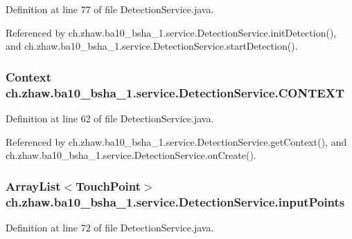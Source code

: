 Definition at line 77 of file DetectionService.java.

Referenced by ch.zhaw.ba10\_\-bsha\_\-1.service.DetectionService.initDetection(), and ch.zhaw.ba10\_\-bsha\_\-1.service.DetectionService.startDetection().\hypertarget{classch_1_1zhaw_1_1ba10__bsha__1_1_1service_1_1DetectionService_a0e249aa466d4da8bcac9f75942129aa6}{
\subsubsection[{CONTEXT}]{\setlength{\rightskip}{0pt plus 5cm}Context {\bf ch.zhaw.ba10\_\-bsha\_\-1.service.DetectionService.CONTEXT}}}
\label{classch_1_1zhaw_1_1ba10__bsha__1_1_1service_1_1DetectionService_a0e249aa466d4da8bcac9f75942129aa6}


Definition at line 62 of file DetectionService.java.

Referenced by ch.zhaw.ba10\_\-bsha\_\-1.service.DetectionService.getContext(), and ch.zhaw.ba10\_\-bsha\_\-1.service.DetectionService.onCreate().\hypertarget{classch_1_1zhaw_1_1ba10__bsha__1_1_1service_1_1DetectionService_a6bf9d1f281b4bc5efb555b742f2ad928}{
\subsubsection[{inputPoints}]{\setlength{\rightskip}{0pt plus 5cm}ArrayList$<${\bf TouchPoint}$>$ {\bf ch.zhaw.ba10\_\-bsha\_\-1.service.DetectionService.inputPoints}}}
\label{classch_1_1zhaw_1_1ba10__bsha__1_1_1service_1_1DetectionService_a6bf9d1f281b4bc5efb555b742f2ad928}


Definition at line 72 of file DetectionService.java.


